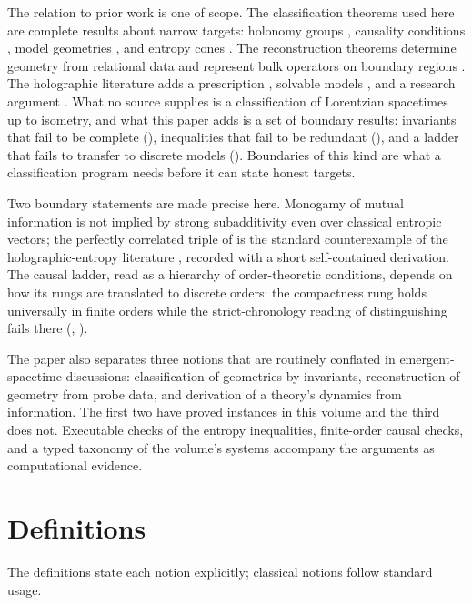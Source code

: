 \documentclass[11pt,letterpaper]{article}
\theoremstyle{definition}
\theoremstyle{remark}
\begin{document}
The relation to prior work is one of scope. The classification theorems used here are complete results about narrow targets: holonomy groups \cite{galaev}, causality conditions \cite{minguzzisanchez}, model geometries \cite{perelman,thurston1982}, and entropy cones \cite{baoetal}. The reconstruction theorems determine geometry from relational data \cite{malament} and represent bulk operators on boundary regions \cite{dongharlowwall}. The holographic literature adds a prescription \cite{ryutakayanagi}, solvable models \cite{haappy}, and a research argument \cite{vanraamsdonk}. What no source supplies is a classification of Lorentzian spacetimes up to isometry, and what this paper adds is a set of boundary results: invariants that fail to be complete (), inequalities that fail to be redundant (), and a ladder that fails to transfer to discrete models (). Boundaries of this kind are what a classification program needs before it can state honest targets.

Two boundary statements are made precise here. Monogamy of mutual information is not implied by strong subadditivity even over classical entropic vectors; the perfectly correlated triple of  is the standard counterexample of the holographic-entropy literature \cite{hhm,baoetal}, recorded with a short self-contained derivation. The causal ladder, read as a hierarchy of order-theoretic conditions, depends on how its rungs are translated to discrete orders: the compactness rung holds universally in finite orders while the strict-chronology reading of distinguishing fails there (, ).

The paper also separates three notions that are routinely conflated in emergent-spacetime discussions: classification of geometries by invariants, reconstruction of geometry from probe data, and derivation of a theory's dynamics from information. The first two have proved instances in this volume and the third does not. Executable checks of the entropy inequalities, finite-order causal checks, and a typed taxonomy of the volume's systems accompany the arguments as computational evidence.

\section{Definitions}

The definitions state each notion explicitly; classical notions follow standard usage.
\end{document}
